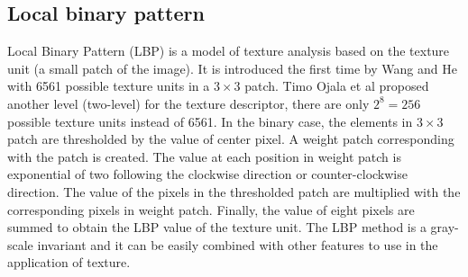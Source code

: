 \subsection{Local binary pattern}
Local Binary Pattern (LBP) is a model of texture analysis based on the texture unit (a small patch of the image). It is introduced the first time by Wang and He \cite{wang1990texture} with 6561 possible texture units in a $3 \times 3$ patch. Timo Ojala et al \cite{ojala1996comparative} proposed another level (two-level) for the texture descriptor, there are only $2^8 = 256$ possible texture units instead of 6561. In the binary case, the elements in $3 \times 3$ patch are thresholded by the value of center pixel. A weight patch corresponding with the patch is created. The value at each position in weight patch is exponential of two following the clockwise direction or counter-clockwise direction. The value of the pixels in the thresholded patch are multiplied with the corresponding pixels in weight patch. Finally, the value of eight pixels are summed to obtain the LBP value of the texture unit. The LBP method is a gray-scale invariant and it can be easily combined with other features to use in the application of texture.
